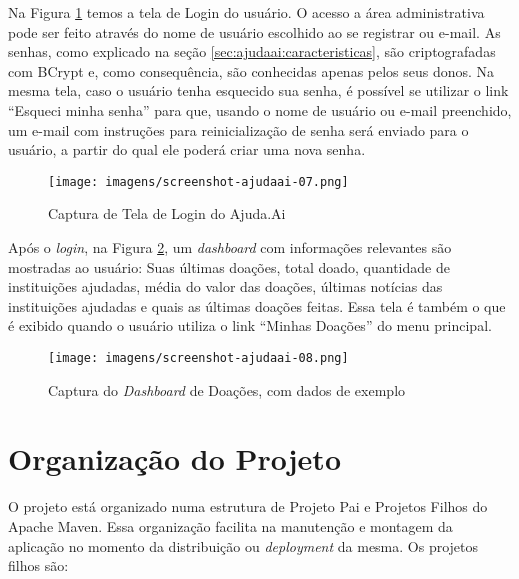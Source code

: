 Na Figura \ref{fig:ss_ajudaai_07} temos a tela de Login do usuário. O acesso a área administrativa pode ser feito através do nome de usuário escolhido ao se registrar ou e-mail. As senhas, como explicado na seção \ref{sec:ajudaai:caracteristicas}, são criptografadas com BCrypt e, como consequência, são conhecidas apenas pelos seus donos. Na mesma tela, caso o usuário tenha esquecido sua senha, é possível se utilizar o link ``Esqueci minha senha'' para que, usando o nome de usuário ou e-mail preenchido, um e-mail com instruções para reinicialização de senha será enviado para o usuário, a partir do qual ele poderá criar uma nova senha.

\begin{figure}[H]
	\caption{\label{fig:ss_ajudaai_07}Captura de Tela de Login do Ajuda.Ai}
    \centering
    \texttt{[image: imagens/screenshot-ajudaai-07.png]}
\end{figure}

Após o \emph{login}, na Figura \ref{fig:ss_ajudaai_08}, um \emph{dashboard} com informações relevantes são mostradas ao usuário: Suas últimas doações, total doado, quantidade de instituições ajudadas, média do valor das doações, últimas notícias das instituições ajudadas e quais as últimas doações feitas. Essa tela é também o que é exibido quando o usuário utiliza o link ``Minhas Doações'' do menu principal.

\begin{figure}[H]
	\caption{\label{fig:ss_ajudaai_08}Captura do \emph{Dashboard} de Doações, com dados de exemplo}
    \centering
    \texttt{[image: imagens/screenshot-ajudaai-08.png]}
\end{figure}










\section{Organização do Projeto} \label{sec:ajudaai:organizacao}
O projeto está organizado numa estrutura de Projeto Pai e Projetos Filhos do Apache Maven. Essa organização facilita na manutenção e montagem da aplicação no momento da distribuição ou \emph{deployment} da mesma. Os projetos filhos são:


